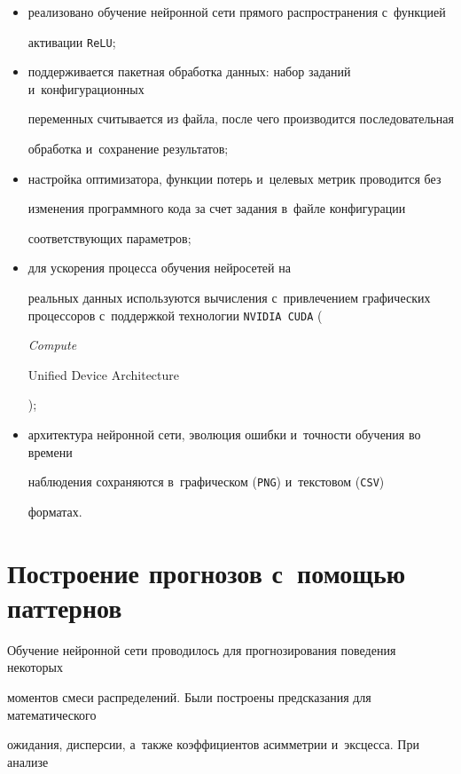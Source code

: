 \begin{itemize}


\item реализовано обучение нейронной сети прямого распространения с~функцией 


активации \verb"ReLU";


\item поддерживается пакетная обработка данных: набор заданий и~конфигурационных 


переменных считывается из файла, после чего производится последовательная 


обработка и~сохранение результатов;


\item настройка оптимизатора, функции потерь и~целевых метрик проводится без 


изменения программного кода за счет задания в~файле конфигурации 


соответствующих параметров;


\item для ускорения процесса обучения нейросетей на 


реальных данных используются вычисления с~привлечением графических процессоров с~поддержкой технологии \verb"NVIDIA CUDA" ({\em Compute


Unified Device Architecture});


\item архитектура нейронной сети, эволюция ошибки и~точности обучения во времени 


наблюдения сохраняются в~графическом (\verb"PNG") и~текстовом (\verb"CSV") 


форматах.


\end{itemize}





\section{Построение прогнозов с~помощью паттернов}





Обучение нейронной сети проводилось для прогнозирования поведения некоторых 


моментов смеси распределений. Были построены предсказания для математического 


ожидания, дисперсии, а~также коэффициентов асимметрии и~эксцесса. При анализе 


